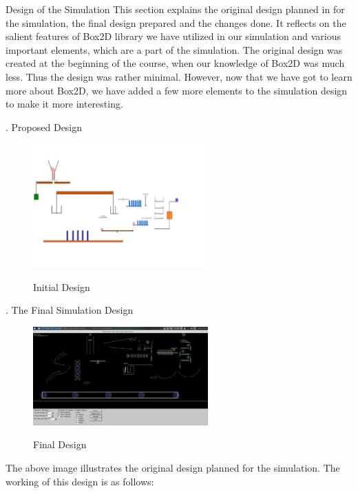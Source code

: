 \documentclass[a4paper,11pt]{resume}
\begin{document}
\begin{rSection}{{\heading Design of the Simulation}}
This section explains the original design planned in for the simulation, the final design prepared and the changes done. It reflects on the salient features of Box2D library we have utilized in our simulation and various important elements, which are a part of the simulation. The original design was created at the beginning of the course, when our knowledge of Box2D was much less. Thus the design was rather minimal. However, now that we have got to learn more about Box2D, we have added a few more elements to the simulation design to make it more interesting. \\
\begin{rSubsection}{{. Proposed Design}}{}{}{}
\begin{figure}[H]
\centering
\includegraphics[width=0.6\textwidth]{init}
\label{fig:init}
\caption{Initial Design}
\end{figure}
\end{rSubsection}
\newpage
\begin{rSubsection}{{. The Final Simulation Design}}{}{}{}
\begin{figure}[H]
\centering
\includegraphics[width=0.6\textwidth]{screen.jpg}
\label{fig:find}
\caption{Final Design}
\end{figure}
The above image illustrates the original design planned for the simulation. The working of this design is as follows: 
\end{rSubsection}
\begin{rSubsection}{}{}{}{}

\end{rSubsection}
\end{rSection}
\end{document}
